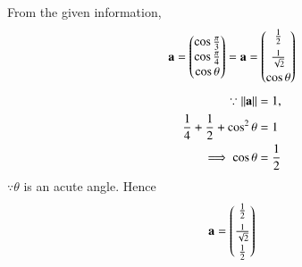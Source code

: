 From the given information,
		\begin{align}
			\mathbf{a}=\begin{pmatrix}\cos\frac{\pi}{3}\\\cos\frac{\pi}{4}\\\cos\theta\end{pmatrix}
			= 
			\mathbf{a}=\begin{pmatrix}\frac{1}{2}\\[1ex]\frac{1}{\sqrt{2}}\\[1ex]\cos\theta\end{pmatrix}
		\end{align}
\begin{align}
\because    \left\lVert\mathbf{a}\right\rVert&=1,
\\
\frac{1}{4}+\frac{1}{2}+\cos^2\theta&=1
\\
    \implies\cos\theta &=\frac{1}{2}
\end{align}
$\because \theta$ is an acute angle.
    Hence 
\begin{align}
		\mathbf{a}=\begin{pmatrix}\frac{1}{2}\\[1ex] \frac{1}{\sqrt{2}}\\[1ex] \frac{1}{2}\end{pmatrix}
\end{align}
